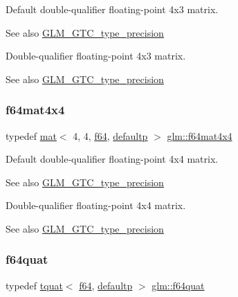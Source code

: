 Default double-\/qualifier floating-\/point 4x3 matrix. \begin{DoxySeeAlso}{See also}
\mbox{\hyperlink{group__gtc__type__precision}{G\+L\+M\+\_\+\+G\+T\+C\+\_\+type\+\_\+precision}}
\end{DoxySeeAlso}
Double-\/qualifier floating-\/point 4x3 matrix. \begin{DoxySeeAlso}{See also}
\mbox{\hyperlink{group__gtc__type__precision}{G\+L\+M\+\_\+\+G\+T\+C\+\_\+type\+\_\+precision}} 
\end{DoxySeeAlso}
\mbox{\label{group__gtc__type__precision_ga5fc21633b1546e4599609c47b4c8dac4}} 
\subsubsection{\texorpdfstring{f64mat4x4}{f64mat4x4}}
{\footnotesize\ttfamily typedef \mbox{\hyperlink{structglm_1_1mat}{mat}}$<$ 4, 4, \mbox{\hyperlink{group__gtc__type__precision_ga2bba392e555124b36cde6abba349bab3}{f64}}, \mbox{\hyperlink{namespaceglm_a36ed105b07c7746804d7fdc7cc90ff25a9d21ccd8b5a009ec7eb7677befc3bf51}{defaultp}} $>$ \mbox{\hyperlink{group__gtc__type__precision_ga5fc21633b1546e4599609c47b4c8dac4}{glm\+::f64mat4x4}}}

Default double-\/qualifier floating-\/point 4x4 matrix. \begin{DoxySeeAlso}{See also}
\mbox{\hyperlink{group__gtc__type__precision}{G\+L\+M\+\_\+\+G\+T\+C\+\_\+type\+\_\+precision}}
\end{DoxySeeAlso}
Double-\/qualifier floating-\/point 4x4 matrix. \begin{DoxySeeAlso}{See also}
\mbox{\hyperlink{group__gtc__type__precision}{G\+L\+M\+\_\+\+G\+T\+C\+\_\+type\+\_\+precision}} 
\end{DoxySeeAlso}
\mbox{\label{group__gtc__type__precision_ga5b54d7b36fbee5e271f73e6ed74e7172}} 
\subsubsection{\texorpdfstring{f64quat}{f64quat}}
{\footnotesize\ttfamily typedef \mbox{\hyperlink{structglm_1_1tquat}{tquat}}$<$ \mbox{\hyperlink{group__gtc__type__precision_ga2bba392e555124b36cde6abba349bab3}{f64}}, \mbox{\hyperlink{namespaceglm_a36ed105b07c7746804d7fdc7cc90ff25a9d21ccd8b5a009ec7eb7677befc3bf51}{defaultp}} $>$ \mbox{\hyperlink{group__gtc__type__precision_ga5b54d7b36fbee5e271f73e6ed74e7172}{glm\+::f64quat}}}


